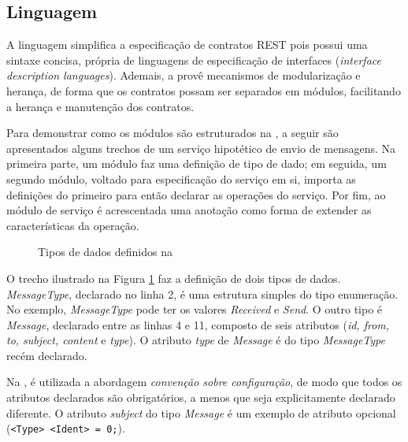 \subsection{Linguagem}
\label{linguagemNeoIDL}
\vspace{-6mm}

A linguagem \neoidl{} simplifica a especificação de contratos REST pois possui
uma sintaxe concisa, própria de linguagens de especificação de interfaces
(\emph{interface description languages}). Ademais, a \neoidl{} provê mecanismos de
modularização e herança, de forma que os contratos possam ser separados em
módulos, facilitando a herança e manutenção dos
contratos. 

Para demonstrar como os módulos são estruturados na
\neoidl{}, a seguir são apresentados alguns trechos de um serviço hipotético
de envio de mensagens. Na primeira parte, um módulo faz uma definição de tipo
de dado; em seguida, um segundo módulo, voltado para especificação do serviço em
si, importa as definições do primeiro para então declarar as operações do
serviço. Por fim, ao módulo de serviço é acrescentada uma anotação como
forma de extender as características da operação.

\vspace{6mm}

\begin{figure}[h]
\begin{small}

\vspace{-.5cm}
\end{small} 
\caption{Tipos de dados definidos na \neoidl}
\label{lst:messagedata-neo}
\end{figure}

O trecho ilustrado na Figura \ref{lst:messagedata-neo} faz a definição de dois
tipos de dados. \emph{MessageType}, declarado no linha 2, é uma estrutura
simples do tipo enumeração. No exemplo, \emph{MessageType} pode ter os valores
\emph{Received} e \emph{Send}.
O outro tipo é \emph{Message}, declarado entre as linhas 4 e 11,
composto de seis atributos (\emph{id, from, to, subject, content} e
\emph{type}).
O atributo \emph{type} de \emph{Message} é do tipo \emph{MessageType} recém declarado.

Na \neoidl{}, é utilizada a abordagem \emph{convenção sobre configuração}, de
modo que todos os atributos declarados são obrigatórios, a menos que
seja explicitamente declarado diferente. O atributo \emph{subject} do tipo
\emph{Message} é um exemplo de atributo opcional (\texttt{<Type> <Ident> = 0;}).

